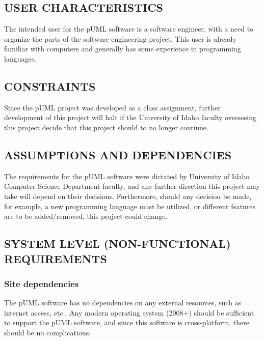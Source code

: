 \documentclass[twoside,letterpaper]{article}
\begin{document}
\subsection[USER CHARACTERISTICS]{\rmfamily\bfseries\color{black}
USER CHARACTERISTICS}
{\color{black}
The intended user for the pUML software is a software engineer, with a need to organize
the parts of the software engineering project. This user is already familiar with
computers and generally has some experience in programming languages.
}

\subsection[CONSTRAINTS]{\rmfamily\bfseries\color{black}
CONSTRAINTS}
{\color{black}
Since the pUML project was developed as a class assignment,
further development of this project will halt if the University of Idaho
faculty overseeing this project decide that this project should to no longer continue.
}

\subsection[ASSUMPTIONS AND DEPENDENCIES]{\rmfamily\bfseries\color{black}
ASSUMPTIONS AND DEPENDENCIES}
{\color{black}
The requirements for the pUML software were dictated by University of Idaho Computer Science
Department faculty, and any further direction this project may take will depend on their decisions.  
Furthermore, should any decision be made, for example,  a new programming language must be utilized,
or different features are to be added/removed, this project could change.
}




\subsection[SYSTEM LEVEL (NON{}-FUNCTIONAL)
REQUIREMENTS]{\rmfamily\bfseries\color{black}
SYSTEM LEVEL (NON-FUNCTIONAL) REQUIREMENTS}

\subsubsection[Site dependencies]{\rmfamily\bfseries\color{black}
Site dependencies}
{\color{black}
The pUML software has no dependencies on any external resources, such as internet access, etc..
Any modern operating system (2008+) should be sufficient to support the pUML software,
and since this software is cross-platform, there should be no complications.
}
\end{document}
